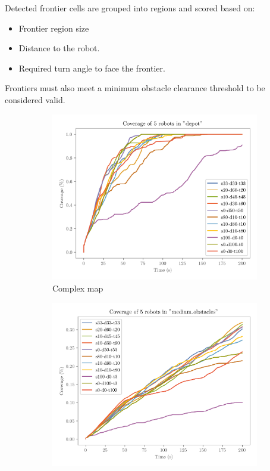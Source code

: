 Detected frontier cells are grouped into regions and scored based on:

\begin{itemize}
  \item Frontier region size
  \item Distance to the robot.
  \item Required turn angle to face the frontier.
\end{itemize}

Frontiers must also meet a minimum obstacle clearance threshold to be considered valid.

\begin{figure}[H]
    \centering
    \begin{subfigure}[b]{0.45\textwidth}
        \centering
        \includegraphics[width=\textwidth]{figures/frontier_eval_params_depot.png}
        \caption{Complex map}
    \end{subfigure}
    \hfill
    \begin{subfigure}[b]{0.45\textwidth}
        \centering
        \includegraphics[width=\textwidth]{figures/frontier_eval_params_medium_obstacles.png}

\end{subfigure}
\end{figure}
